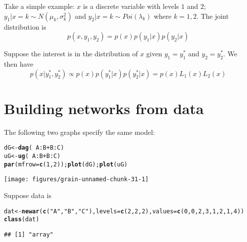 \documentclass[10pt]{article}\usepackage[]{graphicx}\usepackage[]{color}
\makeatletter
\def\maxwidth{ %
  \ifdim\Gin@nat@width>\linewidth
    \linewidth
  \else
    \Gin@nat@width
  \fi
}
\newcommand{\hlnum}[1]{\textcolor[rgb]{0.686,0.059,0.569}{#1}}%
\newcommand{\hlstr}[1]{\textcolor[rgb]{0.192,0.494,0.8}{#1}}%
\newcommand{\hlopt}[1]{\textcolor[rgb]{0,0,0}{#1}}%
\newcommand{\hlstd}[1]{\textcolor[rgb]{0.345,0.345,0.345}{#1}}%
\newcommand{\hlkwb}[1]{\textcolor[rgb]{0.69,0.353,0.396}{#1}}%
\newcommand{\hlkwc}[1]{\textcolor[rgb]{0.333,0.667,0.333}{#1}}%
\newcommand{\hlkwd}[1]{\textcolor[rgb]{0.737,0.353,0.396}{\textbf{#1}}}%
\newenvironment{kframe}{%
 \def\at@end@of@kframe{}%
 \ifinner\ifhmode%
  \def\at@end@of@kframe{\end{minipage}}%
  \begin{minipage}{\columnwidth}%
 \fi\fi%
 \def\FrameCommand##1{\hskip\@totalleftmargin \hskip-\fboxsep
 \colorbox{shadecolor}{##1}\hskip-\fboxsep
     \hskip-\linewidth \hskip-\@totalleftmargin \hskip\columnwidth}%
 \MakeFramed {\advance\hsize-\width
   \@totalleftmargin\z@ \linewidth\hsize
   \@setminipage}}%
 {\par\unskip\endMakeFramed%
 \at@end@of@kframe}
\newenvironment{knitrout}{}{} %
\makeatother
\begin{document}
Take a simple example: $x$ is a discrete variable with levels $1$ and
$2$; $y_1|x=k \sim N(\mu_k, \sigma^2_k)$ and $y_2|x=k \sim
Poi(\lambda_k)$ where $k=1,2$. The joint distribution is
\begin{displaymath}
  p(x,y_1, y_2) = p(x)p(y_1|x)p(y_2|x)
\end{displaymath}

Suppose the interest is in the distribution of $x$ given
$y_1=y_1^*$ and $y_2=y_2^*$. We then have
\begin{displaymath}
  p(x|y_1^*, y_2^*) \propto p(x) p(y_1^*|x)p(y_2^*|x) =
  p(x) L_1(x) L_2(x)
\end{displaymath}







\section{Building networks from data}
\label{sec:using-textttsm-argum}

The following two graphs specify the same model:
\begin{knitrout}
\color{fgcolor}\begin{kframe}
\begin{alltt}
\hlstd{dG}  \hlkwb{<-} \hlkwd{dag}\hlstd{(}\hlopt{~}\hlstd{A}\hlopt{:}\hlstd{B} \hlopt{+} \hlstd{B}\hlopt{:}\hlstd{C)}
\hlstd{uG}  \hlkwb{<-} \hlkwd{ug}\hlstd{(}\hlopt{~}\hlstd{A}\hlopt{:}\hlstd{B} \hlopt{+} \hlstd{B}\hlopt{:}\hlstd{C)}
\hlkwd{par}\hlstd{(}\hlkwc{mfrow}\hlstd{=}\hlkwd{c}\hlstd{(}\hlnum{1}\hlstd{,}\hlnum{2}\hlstd{));} \hlkwd{plot}\hlstd{( dG );} \hlkwd{plot}\hlstd{( uG )}
\end{alltt}
\end{kframe}
\texttt{[image: figures/grain-unnamed-chunk-31-1]} 

\end{knitrout}

Suppose data is
\begin{knitrout}
\color{fgcolor}\begin{kframe}
\begin{alltt}
\hlstd{dat} \hlkwb{<-} \hlkwd{newar}\hlstd{(}\hlkwd{c}\hlstd{(}\hlstr{"A"}\hlstd{,} \hlstr{"B"}\hlstd{,} \hlstr{"C"}\hlstd{),} \hlkwc{levels}\hlstd{=}\hlkwd{c}\hlstd{(}\hlnum{2}\hlstd{,} \hlnum{2}\hlstd{,} \hlnum{2}\hlstd{),} \hlkwc{values}\hlstd{=}\hlkwd{c}\hlstd{(}\hlnum{0}\hlstd{,} \hlnum{0}\hlstd{,} \hlnum{2}\hlstd{,} \hlnum{3}\hlstd{,} \hlnum{1}\hlstd{,} \hlnum{2}\hlstd{,} \hlnum{1}\hlstd{,} \hlnum{4}\hlstd{))}
\hlkwd{class}\hlstd{(dat)}
\end{alltt}
\begin{verbatim}
## [1] "array"
\end{verbatim}
\end{kframe}
\end{knitrout}
\end{document}
